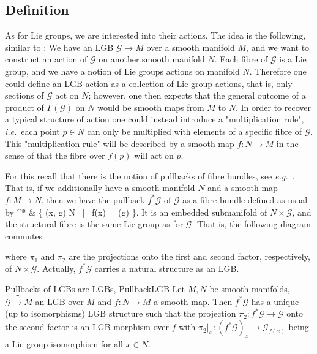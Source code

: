 \documentclass[a4paper,oneside,11pt,bibliography=totoc]{scrartcl}
\def\ba#1\ea{\begin{align}#1\end{align}}
\theoremstyle{plain}
\theoremstyle{remark}
\theoremstyle{definition}
\begin{document}
\subsection{Definition}

As for Lie groups, we are interested into their actions. The idea is the following, similar to \cite[\S 1.6, discussion around Def.\ 1.6.1, page 34]{mackenzieGeneralTheory}: We have an LGB $\mathcal{G} \to M$ over a smooth manifold $M$, and we want to construct an action of $\mathcal{G}$ on another smooth manifold $N$. Each fibre of $\mathcal{G}$ is a Lie group, and we have a notion of Lie groups actions on manifold $N$. Therefore one could define an LGB action as a collection of Lie group actions, that is, only sections of $\mathcal{G}$ act on $N$; however, one then expects that the general outcome of a product of $\Gamma(\mathcal{G})$ on $N$ would be smooth maps from $M$ to $N$. In order to recover a typical structure of action one could instead introduce a "multiplication rule", \textit{i.e.}~each point $p \in N$ can only be multiplied with elements of a specific fibre of $\mathcal{G}$. This "multiplication rule" will be described by a smooth map $f: N \to M$ in the sense of that the fibre over $f(p)$ will act on $p$.

For this recall that there is the notion of pullbacks of fibre bundles, see \textit{e.g.}\ \cite[\S 4.1.4, page 203ff.; especially Thm.\ 4.1.17, page 204f.]{Hamilton}. That is, if we additionally have a smooth manifold $N$ and a smooth map $f: M \to N$, then we have the pullback $f^*\mathcal{G}$ of $\mathcal{G}$ as a fibre bundle defined as usual by
\ba
f^*
&\coloneqq
\left\{
	(x, g) \in N \times {} ~\middle|~
	f(x) = \pi(g)
\right\}.
\ea
It is an embedded submanifold of $N \times \mathcal{G}$, and the structural fibre is the same Lie group as for $\mathcal{G}$.
That is, the following diagram commutes
\begin{center}
\end{center}
where $\pi_1$ and $\pi_2$ are the projections onto the first and second factor, respectively, of $N \times \mathcal{G}$. Actually, $f^*\mathcal{G}$ carries a natural structure as an LGB.

\begin{corollaries}{Pullbacks of LGBs are LGBs, \newline \cite[\S 2.3, simplified situation of the discussion around Prop.\ 2.3.1, page 63ff.]{mackenzieGeneralTheory}}{PullbackLGB}
Let $M, N$ be smooth manifolds, $\mathcal{G} \stackrel{\pi}{\to} M$ an LGB over $M$ and $f: N \to M$ a smooth map. Then $f^*\mathcal{G}$ has a unique (up to isomorphisms) LGB structure such that the projection $\pi_2: f^*\mathcal{G} \to \mathcal{G}$ onto the second factor is an LGB morphism over $f$ with $\pi_2|_x: (f^*\mathcal{G})_x \to \mathcal{G}_{f(x)}$ being a Lie group isomorphism for all $x \in N$.
\end{corollaries}
\end{document}
